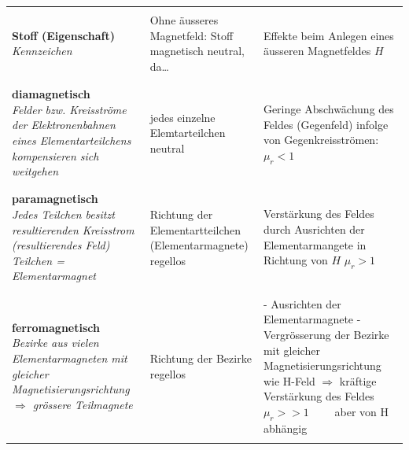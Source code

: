 \renewcommand{\arraystretch}{.25}
\begin{tabular}{|l|l|l|}
	\hline &&\\
	\parbox{5.5cm}{
	\textbf{Stoff (Eigenschaft)}\\
	\textit{Kennzeichen}} &
	
	\parbox{5.5cm}{
	Ohne äusseres Magnetfeld: Stoff magnetisch neutral, da\ldots } &
	
	\parbox{7cm}{
	Effekte beim Anlegen eines äusseren Magnetfeldes $H$
	} \\ &&\\ 
	\hline
	\hline &&\\
		
	\parbox{5.5cm}{
	\textbf{diamagnetisch}\\
	\textit{Felder bzw. Kreisströme der Elektronenbahnen eines Elementarteilchens
	kompensieren sich weitgehen} } &
	
	\parbox{5.5cm}{
	jedes einzelne Elemtarteilchen neutral
	} &
	
	\parbox{7cm}{
	Geringe Abschwächung des Feldes (Gegenfeld) infolge von Gegenkreisströmen:\\
	$\mu_r < 1$ } \\ &&\\
	\hline &&\\
	
	\parbox{5.5cm}{
	\textbf{paramagnetisch}\\
	\textit{Jedes Teilchen besitzt resultierenden Kreisstrom (resultierendes Feld)\\
	Teilchen = Elementarmagnet}
	} &
	
	\parbox{5.5cm}{
	Richtung der Elementartteilchen (Elementarmagnete) regellos	
	} &

	\parbox{7cm}{
	Verstärkung des Feldes durch Ausrichten der Elementarmangete in Richtung von $H$\\
	$\mu_r > 1$	} \\ &&\\
	\hline &&\\ 
	
	\parbox{5.5cm}{
	\textbf{ferromagnetisch}\\
	\textit{Bezirke aus vielen Elementarmagneten mit gleicher Magnetisierungsrichtung\\
	$\Rightarrow$ grössere Teilmagnete}} &
	
	\parbox{5.5cm}{
	Richtung der Bezirke regellos	
	} &
	
	\parbox{7cm}{
	- Ausrichten der Elementarmagnete\\
	- Vergrösserung der Bezirke mit gleicher Magnetisierungsrichtung wie H-Feld\\
	$\Rightarrow$ kräftige Verstärkung des Feldes\\
	$\mu_r >> 1 \qquad$ aber von H abhängig	
	} \\ &&\\
	\hline
\end{tabular}
\renewcommand{\arraystretch}{1}
